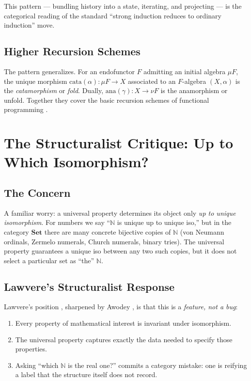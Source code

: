 \documentclass[12pt]{article}
\theoremstyle{definition}
\theoremstyle{remark}
\newcommand{\N}{\mathbb{N}}
\newcommand{\Set}{\mathbf{Set}}
\begin{document}
This pattern --- bundling history into a state, iterating, and projecting --- is the categorical reading of the standard ``strong induction reduces to ordinary induction'' move.

\subsection{Higher Recursion Schemes}

The pattern generalizes. For an endofunctor $F$ admitting an initial algebra $\mu F$, the unique morphism $\mathrm{cata}(\alpha) \colon \mu F \to X$ associated to an $F$-algebra $(X, \alpha)$ is the \emph{catamorphism} or \emph{fold}. Dually, $\mathrm{ana}(\gamma) \colon X \to \nu F$ is the anamorphism or unfold. Together they cover the basic recursion schemes of functional programming \cite{MeijerFokkingaPaterson1991}.

\section{The Structuralist Critique: Up to Which Isomorphism?}
\label{sec:critique}

\subsection{The Concern}

A familiar worry: a universal property determines its object only \emph{up to unique isomorphism}. For numbers we say ``$\N$ is unique up to unique iso,'' but in the category $\Set$ there are many concrete bijective copies of $\N$ (von Neumann ordinals, Zermelo numerals, Church numerals, binary tries). The universal property guarantees a unique iso between any two such copies, but it does not select a particular set as ``the'' $\N$.

\subsection{Lawvere's Structuralist Response}

Lawvere's position \cite{Lawvere1966,Lawvere2003}, sharpened by Awodey \cite{Awodey1996,Awodey2014}, is that this is a \emph{feature, not a bug}:
\begin{enumerate}
  \item Every property of mathematical interest is invariant under isomorphism.
  \item The universal property captures exactly the data needed to specify those properties.
  \item Asking ``which $\N$ is the real one?'' commits a category mistake: one is reifying a label that the structure itself does not record.
\end{enumerate}
\end{document}
